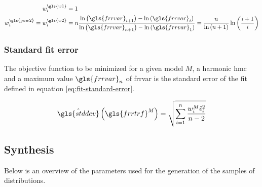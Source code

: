 \begin{align}
w^{\gls{w1}}_i &= 1 \\
w^{\gls{guw2}}_i = w^{\gls{w2}}_i &=
n
\frac{
\ln \left(\gls{frrvar}_{i + 1} \right) - \ln \left(\gls{frrvar}_i\right)
}{
\ln \left(\gls{frrvar}_{n + 1} \right) - \ln \left(\gls{frrvar}_1\right)
} =
\frac{n}{\ln \left( n + 1 \right)} \ln \left( \frac{i+1}{i} \right)
\end{align}

\subsubsection{Standard fit error}
The objective function to be minimized for a given model \( M \), a harmonic \gls{hmc} and a maximum value \( \gls{frrvar}_n \) of \gls{frrvar} is the standard error of the fit defined in equation \eqref{eq:fit-standard-error}.

\begin{equation}\label{eq:fit-standard-error}
\hat{\gls{stddev}} \left( \gls{frrtrf}^M \right) = \sqrt{\sum_{i=1}^n \frac{w^M_i\hat{\epsilon}_i^2}{n-2}}
\end{equation}

\subsection{Synthesis}\label{sec:synthesis}

Below is an overview of the parameters used for the generation of the samples of distributions.

